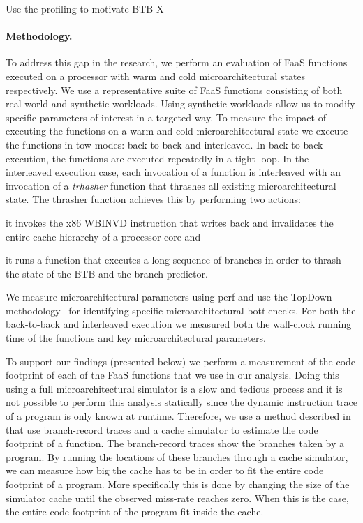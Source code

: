 \documentclass[../main.tex]{subfiles}
\begin{document}
\begin{refsection}
Use the profiling to motivate BTB-X

\paragraph{Methodology.}
To address this gap in the research, we perform an evaluation of FaaS
functions executed on a processor with warm and cold
microarchitectural states respectively. We use a representative suite
of FaaS functions consisting of both real-world and synthetic
workloads. Using synthetic workloads allow us to modify specific
parameters of interest in a targeted way. To measure the impact of
executing the functions on a warm and cold microarchitectural state we
execute the functions in tow modes: back-to-back and interleaved. In
back-to-back execution, the functions are executed repeatedly in a
tight loop. In the interleaved execution case, each invocation of a
function is interleaved with an invocation of a \emph{trhasher}
function that thrashes all existing microarchitectural state. The
thrasher function achieves this by performing two
actions:
\begin{inparaenum}[1)]
\item it invokes the x86 WBINVD
  instruction that writes back and invalidates the entire cache
  hierarchy of a processor core and \item it runs a function that
  executes a long sequence of branches in order to thrash the state of
  the BTB and the branch predictor. \end{inparaenum} We measure
microarchitectural parameters using perf and use the TopDown
methodology~\cite{yasin14_top_down} for identifying specific
microarchitectural bottlenecks. For both the back-to-back and
interleaved execution we measured both the wall-clock running time of
the functions and key microarchitectural parameters.

To support our findings (presented below) we perform a measurement of
the code footprint of each of the FaaS functions that we use in our
analysis. Doing this using a full microarchitectural simulator is a
slow and tedious process and it is not possible to perform this
analysis statically since the dynamic instruction trace of a program
is only known at runtime.  Therefore, we use a method described
in~\cite{splash2} that use branch-record traces and a cache simulator
to estimate the code footprint of a function. The branch-record traces
show the branches taken by a program. By running the locations of
these branches through a cache simulator, we can measure how big the
cache has to be in order to fit the entire code footprint of a
program. More specifically this is done by changing the size of the
simulator cache until the observed miss-rate reaches zero. When this
is the case, the entire code footprint of the program fit inside the
cache.



\end{refsection}
\end{document}
